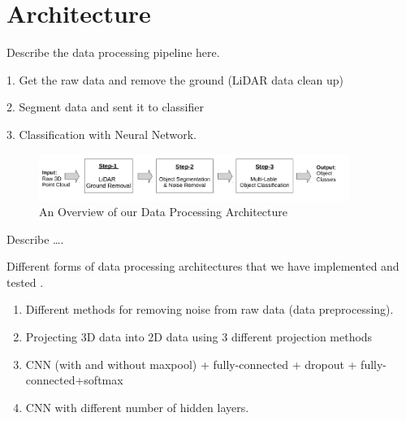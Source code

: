 \section{Architecture}\label{sec:Architecture}



Describe the data processing pipeline here. 


1. Get the raw data and remove the ground (LiDAR data clean up)

2. Segment data and sent it to classifier 

3. Classification with Neural Network. 


\begin{figure}[!t]
 \begin{center}
   \includegraphics[width=0.9\textwidth]{./images/DataProcessingPipleline.pdf}
   \caption{An Overview of our Data Processing Architecture}
   \label{fig:dataPipeline}
 \end{center}
\end{figure}





Describe \ldots. 

Different forms of data processing architectures that we have implemented and tested . 

\begin{enumerate}
  \item Different methods for removing noise from raw data (data preprocessing). 
  \item Projecting 3D data into 2D data using 3 different projection methods 
  \item CNN  (with and without maxpool) + fully-connected + dropout + fully-connected+softmax
  \item CNN with different number of hidden layers. 

\end{enumerate}






